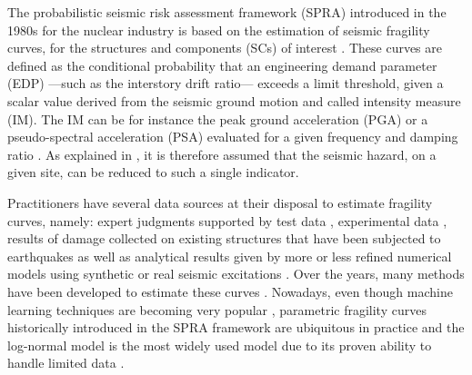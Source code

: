 The probabilistic seismic risk assessment framework (SPRA) introduced in the 1980s for the nuclear industry is based on the estimation of seismic fragility curves, for the structures and components (SCs) of interest \citep{kennedy_probabilistic_1980,kennedy_seismic_1984,park_survey_1998,kennedy_risk_1999,cornell_hazard_2004}. These curves are defined as the conditional probability that an engineering demand parameter (EDP) ---such as the interstory drift ratio--- exceeds a limit threshold, given a scalar value derived from the seismic ground motion and called intensity measure (IM). The IM can be for instance the peak ground acceleration (PGA) or a pseudo-spectral acceleration (PSA) evaluated for a given frequency and damping ratio \citep{ciano_role_2020,sainct_efficient_2020,ciano_novel_2022}. As explained in \cite{cornell_hazard_2004}, it is therefore assumed that the seismic hazard, on a given site, can be reduced to such a single indicator.


Practitioners have several data sources at their disposal to estimate fragility curves, namely: expert judgments supported by test data \citep{kennedy_probabilistic_1980,kennedy_seismic_1984,park_survey_1998,zentner_fragility_2017}, experimental data \citep{park_survey_1998,gardoni_probabilistic_2002,choe_closed-form_2007}, results of damage collected on existing structures that have been subjected to earthquakes \citep{shinozuka_statistical_2000,lallemant_statistical_2015,straub_improved_2008} as well as analytical results given by more or less refined numerical models using synthetic or real seismic excitations \citep{zentner_numerical_2010,wang_influence_2020,mandal_seismic_2016,wang_bayesian_2018,wang_seismic_2018,zhao_seismic_2020}. Over the years, many methods have been developed to estimate these curves \citep{shinozuka_statistical_2000,lallemant_statistical_2015,zentner_fragility_2017}. Nowadays, even though machine learning techniques are becoming very popular  \citep{park_rapid_2014,seo_use_2013,gidaris_kriging_2015,wang_seismic_2018,sainct_efficient_2020}, parametric fragility curves historically introduced in the SPRA framework are ubiquitous in practice and the log-normal model is the most widely used model due to its proven ability to handle limited data \citep{shinozuka_statistical_2000,lallemant_statistical_2015,straub_improved_2008,zentner_numerical_2010,wang_influence_2020,mandal_seismic_2016,hariri-ardebili_probabilistic_2016,wang_bayesian_2018,wang_seismic_2018,zhao_seismic_2020,ellingwood_earthquake_2001,kim_development_2004,mai_seismic_2017,trevlopoulos_parametric_2019,katayama_bayesian-estimation-based_2021}.


